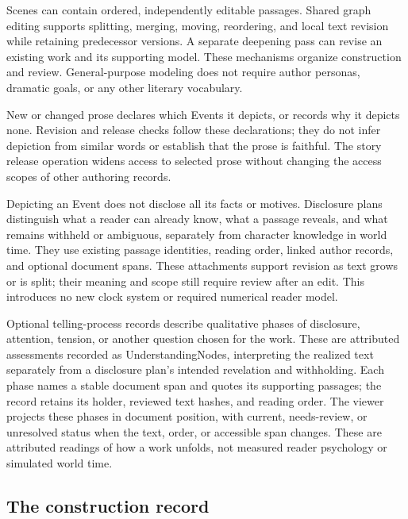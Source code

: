 \documentclass[11pt,a4paper]{article}
\begin{document}
Scenes can contain ordered, independently editable passages. Shared graph
editing supports splitting, merging, moving, reordering, and local text
revision while retaining predecessor versions. A separate deepening pass can
revise an existing work and its supporting model. These mechanisms organize
construction and review.
General-purpose modeling does not require author personas, dramatic goals, or
any other literary vocabulary.

New or changed prose declares which Events it depicts, or records why it
depicts none. Revision and release checks follow these declarations; they do
not infer depiction from similar words or establish that the prose is faithful.
The story release operation widens access to selected prose without changing
the access scopes of other authoring records.

Depicting an Event does not disclose all its facts or motives. Disclosure plans
distinguish what a reader can already know, what a passage reveals, and what
remains withheld or ambiguous, separately from character knowledge in world
time. They use existing passage identities, reading order, linked author
records, and optional document spans. These attachments support revision as
text grows or is split; their meaning and scope still require review after an
edit. This introduces no new clock system or required numerical reader model.

Optional telling-process records describe qualitative phases of disclosure,
attention, tension, or another question chosen for the work. These are attributed
assessments recorded as UnderstandingNodes, interpreting the realized text
separately from a disclosure plan's intended revelation and withholding. Each phase names a
stable document span and quotes its supporting passages; the record retains
its holder, reviewed text hashes, and reading order. The viewer projects these
phases in document position, with current, needs-review, or unresolved status
when the text, order, or accessible span changes. These are attributed readings
of how a work unfolds, not measured reader psychology or simulated world time.

\subsection{The construction record}
\end{document}
